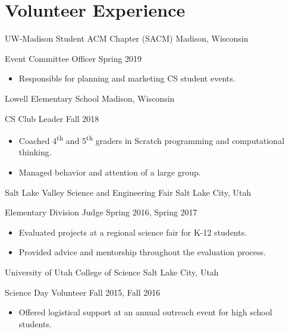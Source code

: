 \section*{Volunteer Experience}

\begin{tab1} UW-Madison Student ACM Chapter (SACM) \> Madison, Wisconsin \end{tab1}
\begin{tab2} Event Committee Officer \> Spring 2019 \end{tab2}
\begin{itemize}
    \item Responsible for planning and marketing CS student events.
\end{itemize}

\blockskip

\begin{tab1} Lowell Elementary School \> Madison, Wisconsin \end{tab1}
\begin{tab2} CS Club Leader \> Fall 2018 \end{tab2}
\begin{itemize}
    \item Coached 4\textsuperscript{th} and 5\textsuperscript{th} graders in Scratch programming and computational thinking.
    \item Managed behavior and attention of a large group.
\end{itemize}

\blockskip

\begin{tab1} Salt Lake Valley Science and Engineering Fair \> Salt Lake City, Utah \end{tab1}
\begin{tab2} Elementary Division Judge \> Spring 2016, Spring 2017 \end{tab2}
\begin{itemize}
    \item Evaluated projects at a regional science fair for K-12 students.
    \item Provided advice and mentorship throughout the evaluation process.
\end{itemize}

\blockskip

\begin{tab1} University of Utah College of Science \> Salt Lake City, Utah \end{tab1}
\begin{tab2} Science Day Volunteer \> Fall 2015, Fall 2016 \end{tab2}
\begin{itemize}
    \item Offered logistical support at an annual outreach event for high school students.
\end{itemize}

